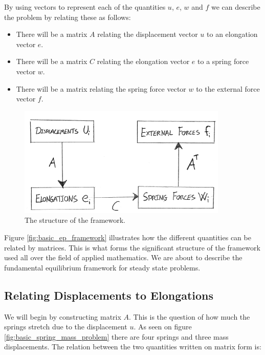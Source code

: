 
By using vectors to represent each of the quantities $u$, $e$, $w$ and
$f$ we can describe the problem by relating these as follows:

\begin{itemize}
\item There will be a matrix $A$ relating the displacement vector
$u$ to an elongation vector $e$.
\item There will be a matrix $C$ relating the elongation vector $e$
  to a spring force vector $w$.
\item There will be a matrix relating the spring force vector $w$ to the
  external force vector $f$. %
\end{itemize}

\begin{figure}
  \centering
  \includegraphics[width=10cm]{./images/equilibrium_framework_basic_ep_framework.png}
\caption{The structure of the framework.}
\label{fig:basic_ep_framework}
\end{figure}

Figure \vref{fig:basic_ep_framework} illustrates how the different
quantities can be related by matrices. This is what forms the significant structure
of the framework used all over the field of applied mathematics. We
are about to describe the fundamental equilibrium framework for
steady state problems. \\

\subsection{Relating Displacements to Elongations}
We will begin by constructing matrix $A$. This is the question of
how much the springs stretch due to the displacement $u$. As seen
on figure \vref{fig:basic_spring_mass_problem} there are four springs
and three mass displacements. The relation between the two quantities
written on matrix form is:

